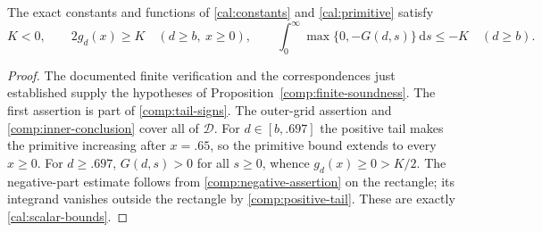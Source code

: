 \begin{theorem}
\label{comp:scalar}
The exact constants and functions of
\eqref{cal:constants} and \eqref{cal:primitive} satisfy
\[
 K<0,\qquad 2g_d(x)\ge K\quad(d\ge b,\ x\ge0),\qquad
 \int_0^\infty\max\{0,-G(d,s)\}\,\mathrm ds\le-K
                                             \quad(d\ge b).
\]
\end{theorem}
\begin{proof}
The documented finite verification and the correspondences just
established supply the hypotheses of
Proposition~\ref{comp:finite-soundness}. The first assertion is
part of \eqref{comp:tail-signs}.
The outer-grid assertion and \eqref{comp:inner-conclusion}
cover all of $\mathcal D$.  For $d\in[b,.697]$ the positive
tail makes the primitive increasing after $x=.65$, so the
primitive bound extends to every $x\ge0$.  For $d\ge.697$,
$G(d,s)>0$ for all $s\ge0$, whence $g_d(x)\ge0>K/2$.
The negative-part estimate follows from
\eqref{comp:negative-assertion} on the rectangle; its integrand
vanishes outside the rectangle by
\eqref{comp:positive-tail}.  These are exactly
\eqref{cal:scalar-bounds}.
\end{proof}
